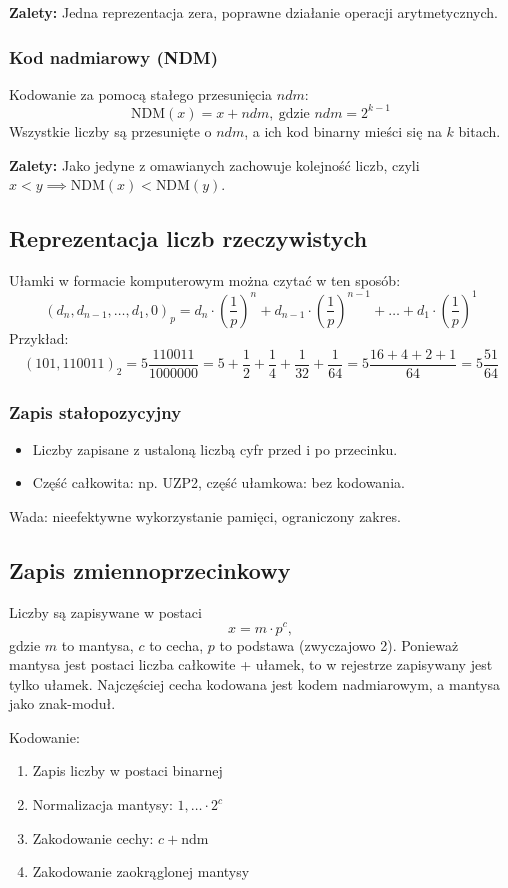 \textbf{Zalety:} Jedna reprezentacja zera, poprawne działanie operacji arytmetycznych.

\subsubsection*{Kod nadmiarowy (NDM)}
Kodowanie za pomocą stałego przesunięcia \( ndm \):
\[
    \text{NDM}(x) = x + ndm, \ \text{gdzie } ndm = 2^{k-1}
\]
Wszystkie liczby są przesunięte o \( ndm \), a ich kod binarny mieści się na \( k \) bitach.

\textbf{Zalety:} Jako jedyne z omawianych zachowuje kolejność liczb, czyli \( x < y \implies \text{NDM}(x) < \text{NDM}(y) \).

\subsection{Reprezentacja liczb rzeczywistych}
Ułamki w formacie komputerowym można czytać w ten sposób:
\[
    (d_n, d_{n-1}, \dots, d_1, 0)_p = d_n \cdot \left(\frac{1}{p}\right)^n + d_{n-1} \cdot \left(\frac{1}{p}\right)^{n-1} + \ldots + d_1 \cdot \left(\frac{1}{p}\right)^1
\]
Przykład:
\[
    (101, 110011)_2 = 5\frac{110011}{1000000} = 5 + \frac{1}{2} + \frac{1}{4} + \frac{1}{32} + \frac{1}{64} = 5\frac{16+4+2+1}{64} = 5\frac{51}{64}
\]

\subsubsection*{Zapis stałopozycyjny}
\begin{itemize}
    \item Liczby zapisane z ustaloną liczbą cyfr przed i po przecinku.
    \item Część całkowita: np. UZP2, część ułamkowa: bez kodowania.
\end{itemize}
Wada: nieefektywne wykorzystanie pamięci, ograniczony zakres.

\subsection*{Zapis zmiennoprzecinkowy}
Liczby są zapisywane w postaci
\[
    x = m \cdot p^c,
\]
gdzie \( m \) to mantysa, \( c \) to cecha, \( p \) to podstawa (zwyczajowo 2).
Ponieważ mantysa jest postaci liczba całkowite + ułamek, to w rejestrze zapisywany jest tylko ułamek. Najczęściej cecha kodowana jest kodem nadmiarowym, a mantysa jako znak-moduł.

Kodowanie:
\begin{enumerate}
    \item Zapis liczby w postaci binarnej
    \item Normalizacja mantysy: \( 1,\ldots \cdot 2^c \)
    \item Zakodowanie cechy: \( c + \text{ndm} \)
    \item Zakodowanie zaokrąglonej mantysy
\end{enumerate}

